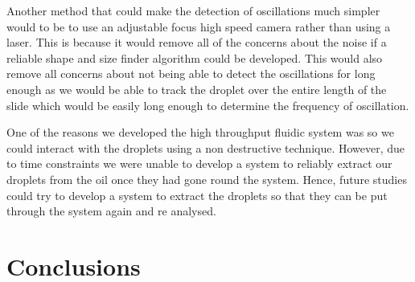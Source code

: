 \documentclass{physics_article_B}
\begin{document}
Another method that could make the detection of oscillations much simpler would to be to use an adjustable focus high speed camera rather than using a laser. This is because it would remove all of the concerns about the noise if a reliable shape and size finder algorithm could be developed. This would also remove all concerns about not being able to detect the oscillations for long enough as we would be able to track the droplet over the entire length of the slide which would be easily long enough to determine the frequency of oscillation. 

One of the reasons we developed the high throughput fluidic system was so we could interact with the droplets using a non destructive technique. However, due to time constraints we were unable to develop a system to reliably extract our droplets from the oil once they had gone round the system. Hence, future studies could try to develop a system to extract the droplets so that they can be put through the system again and re analysed.

\section{Conclusions}

\newpage



\end{document}
